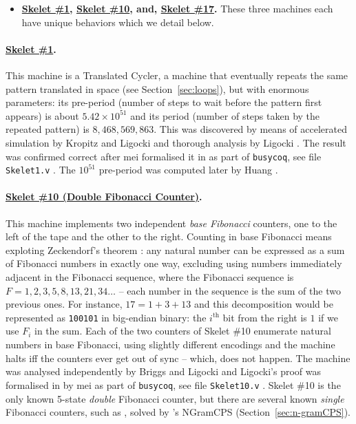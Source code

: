 \begin{itemize}
    \item \textbf{\href{https://bbchallenge.org/1RB1RD_1LC0RC_1RA1LD_0RE0LB_---1RC}{Skelet \#1}, \href{https://bbchallenge.org/1RB0RA_0LC1RA_1RE1LD_1LC0LD_---0RB}{Skelet \#10}, and, \href{https://bbchallenge.org/1RB---_0LC1RE_0LD1LC_1RA1LB_0RB0RA}{Skelet \#17}.} These three machines each have unique behaviors which we detail below.
\end{itemize}
\vspace{-1.5em}
\paragraph{\href{https://bbchallenge.org/1RB1RD_1LC0RC_1RA1LD_0RE0LB_---1RC}{Skelet \#1}.} This machine is a Translated Cycler, \ie a machine that eventually repeats the same pattern translated in space (see Section~\ref{sec:loops}), but with enormous parameters: its pre-period (number of steps to wait before the pattern first appears) is about $5.42 \times 10^{51}$ and its period (number of steps taken by the repeated pattern) is $8,468,569,863$. This was discovered by means of accelerated simulation by Kropitz and Ligocki \cite{uniSk1} and thorough analysis by Ligocki \cite{ShawnSkelet1Before, ShawnSkelet1}. The result was confirmed correct after mei formalised it in \Coq as part of \texttt{busycoq}, see file \texttt{Skelet1.v} \cite{busycoq}. The $10^{51}$ pre-period was computed later by Huang \cite{hipparcosSk1}.
\vspace{-0.5em}
\paragraph{\href{https://bbchallenge.org/1RB0RA_0LC1RA_1RE1LD_1LC0LD_---0RB}{Skelet \#10 (Double Fibonacci Counter)}.} This machine implements two independent \textit{base Fibonacci} counters, one to the left of the tape and the other to the right. Counting in base Fibonacci means exploting Zeckendorf's theorem \cite{wiki:Zeckendorf's_theorem}: any natural number can be expressed as a sum of Fibonacci numbers in exactly one way, excluding using numbers immediately adjacent in the Fibonacci sequence, where the Fibonacci sequence is $F = 1,2,3,5,8,13,21,34\dots$ -- each number in the sequence is the sum of the two previous ones. For instance, $17 = 1 + 3 + 13$ and this decomposition would be represented as \texttt{100101} in big-endian binary: the $i^\text{th}$ bit from the right is $1$ if we use $F_i$ in the sum. Each of the two counters of Skelet \#10 enumerate natural numbers in base Fibonacci, using slightly different encodings and the machine halts iff the counters ever get out of sync -- which, does not happen. The machine was analysed independently by Briggs and Ligocki \cite{DanBriggs,ShawnSkelet10} and Ligocki's proof \cite{ShawnSkelet10} was formalised in \Coq by mei as part of \texttt{busycoq}, see file \texttt{Skelet10.v} \cite{busycoq}. Skelet \#10 is the only known 5-state \textit{double} Fibonacci counter, but there are several known \textit{single} Fibonacci counters, such as , solved by \CoqBB's NGramCPS (Section~\ref{sec:n-gramCPS}).

